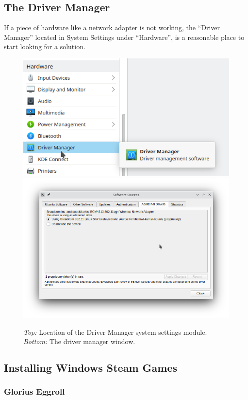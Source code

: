 \documentclass[a4paper, 12pt]{article}
\begin{document}
\subsection{The Driver Manager}

If a piece of hardware like a network adapter is not working, the ``Driver Manager'' located in System
Settings under ``Hardware'', is a reasonable place to start looking for a solution.

\begin{figure}[h]
 \centering
 \includegraphics[width=0.6\linewidth]{images/driver_manager_location}
 \includegraphics[width=0.6\linewidth]{images/driver_manager_window}
 \caption{\textit{Top:} Location of the Driver Manager system settings module. \textit{Bottom:} The driver
 manager window.}\label{fig:drivers}
\end{figure}

\subsection{Installing Windows Steam Games}

\subsubsection{Glorius Eggroll}

\printbibliography
\end{document}
